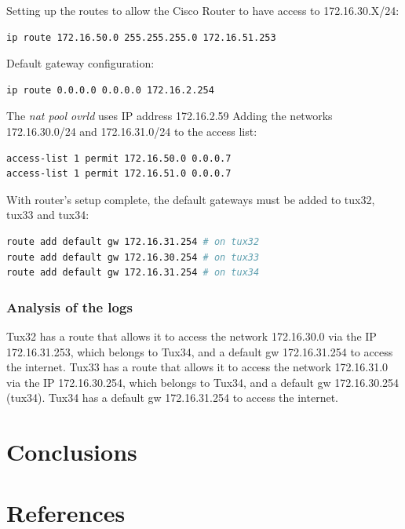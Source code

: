 \documentclass[a4paper,11pt,english]{article}
\begin{document}
            Setting up the routes to allow the Cisco Router to have access to 172.16.30.X/24:

\begin{lstlisting}[language=sh]
ip route 172.16.50.0 255.255.255.0 172.16.51.253
\end{lstlisting}

            Default gateway configuration:

\begin{lstlisting}[language=sh]
ip route 0.0.0.0 0.0.0.0 172.16.2.254
\end{lstlisting}

            The \textit{nat pool ovrld} uses IP address 172.16.2.59
            Adding the networks 172.16.30.0/24 and 172.16.31.0/24 to the access list:

\begin{lstlisting}[language=sh]
access-list 1 permit 172.16.50.0 0.0.0.7
access-list 1 permit 172.16.51.0 0.0.0.7
\end{lstlisting}

            With router's setup complete, the default gateways must be added to tux32, tux33 and tux34:

\begin{lstlisting}[language=sh]
route add default gw 172.16.31.254 # on tux32
route add default gw 172.16.30.254 # on tux33
route add default gw 172.16.31.254 # on tux34
\end{lstlisting}

        \subsubsection{Analysis of the logs}
            Tux32 has a route that allows it to access the network 172.16.30.0 via
            the IP 172.16.31.253, which belongs to Tux34, and a default gw 172.16.31.254
            to access the internet.
            Tux33 has a route that allows it to access the network 172.16.31.0 via
            the IP 172.16.30.254, which belongs to Tux34, and a default gw 172.16.30.254
            (tux34). 
            Tux34 has a default gw 172.16.31.254 to access the internet.


\section{Conclusions}


\section{References}
\end{document}
